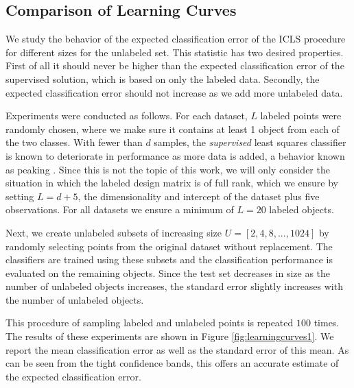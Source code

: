 \documentclass{llncs}
\newcommand{\featdim}{d}
\newcommand{\Nunl}{U}
\newcommand{\Nlab}{L}
\begin{document}
\subsection{Comparison of Learning Curves}
We study the behavior of the expected classification error of the ICLS procedure for different sizes for the unlabeled set. This statistic has two desired properties. First of all it should never be higher than the expected classification error of the supervised solution, which is based on only the labeled data. Secondly, the expected classification error should not increase as we add more unlabeled data. 

Experiments were conducted as follows. For each dataset, $\Nlab$ labeled points were randomly chosen, where we make sure it contains at least 1 object from each of the two classes.  With fewer than $\featdim$ samples, the \emph{supervised} least squares classifier is known to deteriorate in performance as more data is added, a behavior known as peaking \cite{Opper1996,Raudys1998}. Since this is not the topic of this work, we will only consider the situation in which the labeled design matrix is of full rank, which we ensure by setting $\Nlab=\featdim+5$, the dimensionality and intercept of the dataset plus five observations. For all datasets we ensure a minimum of $\Nlab=20$ labeled objects.

Next, we create unlabeled subsets of increasing size $\Nunl=[2,4,8,...,1024]$ by randomly selecting points from the original dataset without replacement. The classifiers are trained using these subsets and the classification performance is evaluated on the remaining objects. Since the test set decreases in size as the number of unlabeled objects increases, the standard error slightly increases with the number of unlabeled objects.

This procedure of sampling labeled and unlabeled points is repeated $100$ times. The results of these experiments are shown in Figure \ref{fig:learningcurves1}. We report the mean classification error as well as the standard error of this mean. As can be seen from the tight confidence bands, this offers an accurate estimate of the expected classification error.

\end{document}
